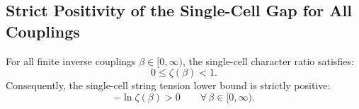 \subsection{Strict Positivity of the Single-Cell Gap for All Couplings}
\label{subsec:strict_positivity_single_cell}

\begin{lemma}
\label{lem:single_cell_strictly_positive}
For all finite inverse couplings $\beta \in [0, \infty)$, the single-cell character ratio satisfies:
\begin{equation}
\label{eq:ch11_zeta_strict_bounds}
0 \le \zeta(\beta) < 1.
\end{equation}
Consequently, the single-cell string tension lower bound is strictly positive:
\begin{equation}
-\ln \zeta(\beta) > 0 \qquad \forall \, \beta \in [0, \infty).
\end{equation}
\end{lemma}


